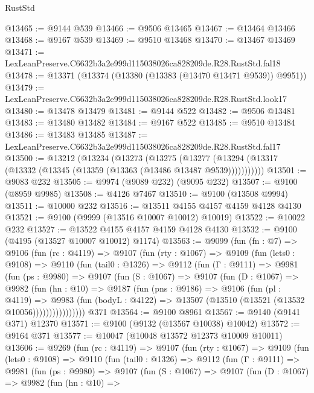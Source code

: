 \begin{lexlean}{RustStd}
\begin{coremodule}
@13465 := @9144 @539
@13466 := @9506 @13465
@13467 := @13464 @13466
@13468 := @9167 @539
@13469 := @9510 @13468
@13470 := @13467 @13469
@13471 := LexLeanPreserve.C6632b3a2e999d115038026ca828209de.R28.RustStd.fal18
@13478 := @13371 (@13374 (@13380 (@13383 (@13470 @13471 @9539)) @9951))
@13479 := LexLeanPreserve.C6632b3a2e999d115038026ca828209de.R28.RustStd.look17
@13480 := @13478 @13479
@13481 := @9144 @522
@13482 := @9506 @13481
@13483 := @13480 @13482
@13484 := @9167 @522
@13485 := @9510 @13484
@13486 := @13483 @13485
@13487 := LexLeanPreserve.C6632b3a2e999d115038026ca828209de.R28.RustStd.fal17
@13500 := @13212
    (@13234
      (@13273
        (@13275
          (@13277 (@13294 (@13317 (@13332 (@13345 (@13359 (@13363 (@13486 @13487 @9539)))))))))))
@13501 := @9083 @232
@13505 := @9974 (@9089 @232) (@9095 @232)
@13507 := @9100 (@8959 @9985)
@13508 := @4126 @7467
@13510 := @9100 (@13508 @9994)
@13511 := @10000 @232
@13516 := @13511 @4155 @4157 @4159 @4128 @4130
@13521 := @9100 (@9999 (@13516 @10007 @10012) @10019)
@13522 := @10022 @232
@13527 := @13522 @4155 @4157 @4159 @4128 @4130
@13532 := @9100 (@4195 (@13527 @10007 @10012) @1174)
@13563 := @9099
    (fun (fn : @7) =>
    @9106
      (fun (rc : @4119) =>
      @9107
        (fun (rty : @1067) =>
        @9109
          (fun (lets0 : @9108) =>
          @9110
            (fun (tail0 : @1326) =>
            @9112
              (fun (Γ : @9111) =>
              @9981
                (fun (ps : @9980) =>
                @9107
                  (fun (S : @1067) =>
                  @9107
                    (fun (D : @1067) =>
                    @9982
                      (fun (hn : @10) =>
                      @9187
                        (fun (pns : @9186) =>
                        @9106
                          (fun (pl : @4119) =>
                          @9983
                            (fun (bodyL : @4122) =>
                            @13507 (@13510 (@13521 (@13532 @10056))))))))))))))))
    @371
@13564 := @9100 @8961
@13567 := @9140 (@9141 @371) @12370
@13571 := @9100 (@9132 (@13567 @10038) @10042)
@13572 := @9164 @371
@13577 := @10047 (@10048 @13572 @12373 @10009 @10011)
@13606 := @9269
    (fun (rc : @4119) =>
    @9107
      (fun (rty : @1067) =>
      @9109
        (fun (lets0 : @9108) =>
        @9110
          (fun (tail0 : @1326) =>
          @9112
            (fun (Γ : @9111) =>
            @9981
              (fun (ps : @9980) =>
              @9107
                (fun (S : @1067) =>
                @9107
                  (fun (D : @1067) =>
                  @9982
                    (fun (hn : @10) =>

\end{coremodule}
\end{lexlean}
